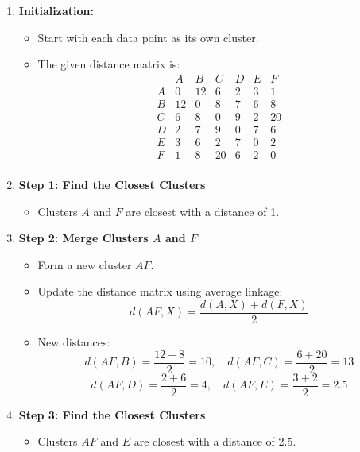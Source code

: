 \documentclass[oneside,solution]{seu-ml-assign}
\begin{document}
\begin{enumerate}
  \item \textbf{Initialization:}
  \begin{itemize}
      \item Start with each data point as its own cluster.
      \item The given distance matrix is:
      \[
      \begin{array}{c|cccccc}
          & A & B & C & D & E & F \\
          \hline
          A & 0 & 12 & 6 & 2 & 3 & 1 \\
          B & 12 & 0 & 8 & 7 & 6 & 8 \\
          C & 6 & 8 & 0 & 9 & 2 & 20 \\
          D & 2 & 7 & 9 & 0 & 7 & 6 \\
          E & 3 & 6 & 2 & 7 & 0 & 2 \\
          F & 1 & 8 & 20 & 6 & 2 & 0 \\
      \end{array}
      \]
  \end{itemize}
  
  \item \textbf{Step 1: Find the Closest Clusters}
  \begin{itemize}
      \item Clusters \(A\) and \(F\) are closest with a distance of 1.
  \end{itemize}
  
  \item \textbf{Step 2: Merge Clusters \(A\) and \(F\)}
  \begin{itemize}
      \item Form a new cluster \(AF\).
      \item Update the distance matrix using average linkage:
      \[
      d(AF, X) = \frac{d(A, X) + d(F, X)}{2}
      \]
      \item New distances:
      \[
      d(AF, B) = \frac{12 + 8}{2} = 10, \quad d(AF, C) = \frac{6 + 20}{2} = 13
      \]
      \[
      d(AF, D) = \frac{2 + 6}{2} = 4, \quad d(AF, E) = \frac{3 + 2}{2} = 2.5
      \]
  \end{itemize}

  \item \textbf{Step 3: Find the Closest Clusters}
  \begin{itemize}
      \item Clusters \(AF\) and \(E\) are closest with a distance of 2.5.
  \end{itemize}
  

\end{enumerate}
\end{document}

